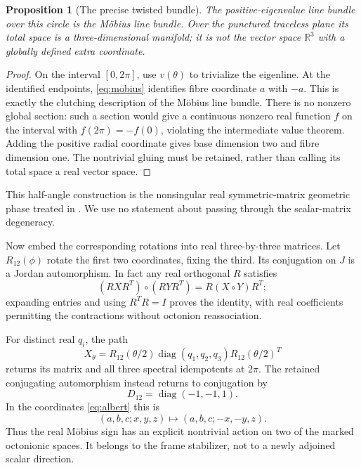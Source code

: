 \documentclass[11pt]{article}
\newtheorem{proposition}[theorem]{Proposition}
\theoremstyle{definition}\newtheorem{definition}[theorem]{Definition}
\newcommand{\R}{\mathbb R}\newcommand{\Q}{\mathbb Q}\newcommand{\Z}{\mathbb Z}
\begin{document}
\begin{proposition}[The precise twisted bundle]
The positive-eigenvalue line bundle over this circle is the M\"obius line bundle. Over the punctured traceless plane its total space is a three-dimensional manifold; it is not the vector space $\R^3$ with a globally defined extra coordinate.
\end{proposition}
\begin{proof}
On the interval $[0,2\pi]$, use $v(\theta)$ to trivialize the eigenline. At the identified endpoints, \eqref{eq:mobius} identifies fibre coordinate $a$ with $-a$. This is exactly the clutching description of the M\"obius line bundle. There is no nonzero global section: such a section would give a continuous nonzero real function $f$ on the interval with $f(2\pi)=-f(0)$, violating the intermediate value theorem. Adding the positive radial coordinate gives base dimension two and fibre dimension one. The nontrivial gluing must be retained, rather than calling its total space a real vector space.
\end{proof}
This half-angle construction is the nonsingular real symmetric-matrix geometric phase treated in \cite[Proposition~6, \S3 and Appendix~B]{rondomanski}. We use no statement about passing through the scalar-matrix degeneracy.

Now embed the corresponding rotations into real three-by-three matrices. Let $R_{12}(\phi)$ rotate the first two coordinates, fixing the third. Its conjugation on $J$ is a Jordan automorphism. In fact any real orthogonal $R$ satisfies
\[
 (RXR^T)\circ(RYR^T)=R(X\circ Y)R^T;
\]
expanding entries and using $R^TR=I$ proves the identity, with real coefficients permitting the contractions without octonion reassociation.

For distinct real $q_i$, the path
\[
 X_\theta=R_{12}(\theta/2)\operatorname{diag}(q_1,q_2,q_3)R_{12}(\theta/2)^T
\]
returns its matrix and all three spectral idempotents at $2\pi$. The retained conjugating automorphism instead returns to conjugation by
\[
 D_{12}=\operatorname{diag}(-1,-1,1).
\]
In the coordinates \eqref{eq:albert} this is
\[
 (a,b,c;x,y,z)\longmapsto(a,b,c;-x,-y,z).
\]
Thus the real M\"obius sign has an explicit nontrivial action on two of the marked octonionic spaces. It belongs to the frame stabilizer, not to a newly adjoined scalar direction.
\end{document}
